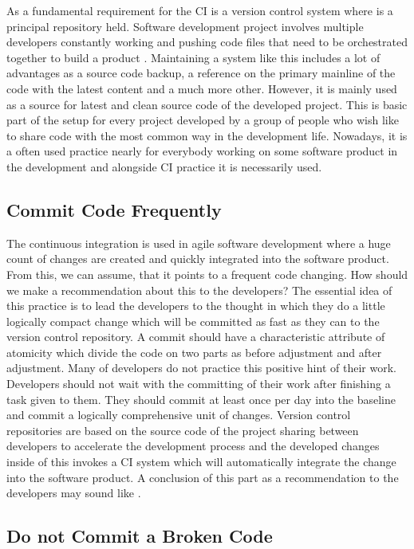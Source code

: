 As a fundamental requirement for the CI is a version control system where is a principal repository held. Software development project involves multiple developers constantly working and pushing code files that need to be orchestrated together to build a product \cite{CI-BP1}. Maintaining a system like this includes a lot of advantages as a source code backup, a reference on the primary mainline of the code with the latest content and a much more other. However, it is mainly used as a source for latest and clean source code of the developed project. This is basic part of the setup for every project developed by a group of people who wish like to share code with the most common way in the development life. Nowadays, it is a often used practice nearly for everybody working on some software product in the development and alongside CI practice it is necessarily used.

\subsection{Commit Code Frequently}

The continuous integration is used in agile software development where a huge count of changes are created and quickly integrated into the software product. From this, we can assume, that it points to a frequent code changing. How should we make a recommendation about this to the developers? The essential idea of this practice is to lead the developers to the thought in which they do a little logically compact change which will be committed as fast as they can to the version control repository. A commit should have a characteristic attribute of atomicity which divide the code on two parts as before adjustment and after adjustment. Many of developers do not practice this positive hint of their work. Developers should not wait with the committing of their work after finishing a task given to them. They should commit at least once per day into the baseline and commit a logically comprehensive unit of changes. Version control repositories are based on the source code of the project sharing between developers to accelerate the development process and the developed changes inside of this invokes a CI system which will automatically integrate the change into the software product. A conclusion of this part as a recommendation to the developers may sound like .

\subsection{Do not Commit a Broken Code}

